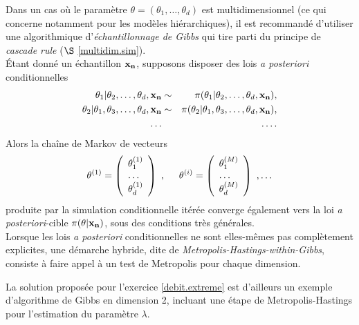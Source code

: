 Dans un cas où  le param\`etre $\theta=(\theta_1,\ldots,\theta_d)$ est multidimensionnel (ce qui concerne notamment pour les mod\`eles hi\'erarchiques), il est recommand\'e d'utiliser une algorithmique d'{\it \'echantillonnage de Gibbs} \cite{Robert2004} qui tire parti du principe de \emph{cascade rule} ($\S$ \ref{multidim.sim}). \\

\'Etant donné un échantillon ${\bf x_n}$,  supposons disposer des lois {\it a posteriori} conditionnelles   
\begin{eqnarray*}
\theta_1|\theta_2,\ldots,\theta_d,{\bf x_n} & \sim & \pi(\theta_1|\theta_2,\ldots,\theta_d,{\bf x_n}), \\
\theta_2|\theta_1,\theta_3,\ldots,\theta_d,{\bf x_n} & \sim & \pi(\theta_2|\theta_1,\theta_3,\ldots,\theta_d,{\bf x_n}), \\
\ldots & & \ldots.
\end{eqnarray*} 
Alors la cha\^ine de Markov de vecteurs 
\begin{eqnarray*}
\theta^{(1)}=\left(\begin{array}{l} \theta^{(1)}_1 \\ \ldots \\ \theta^{(1)}_d\end{array}\right) \ , \hspace{0.5cm} \theta^{(i)}=\left(\begin{array}{l} \theta^{(M)}_1 \\ \ldots \\ \theta^{(M)}_d\end{array}\right) \ , \ldots
\end{eqnarray*}
produite par la simulation conditionnelle it\'er\'ee converge \'egalement vers la loi {\it a posteriori}-cible $\pi(\theta|{\bf x_n})$, sous des conditions tr\`es g\'en\'erales. \\

Lorsque les lois {\it a posteriori} conditionnelles ne sont elles-m\^emes pas compl\`etement explicites, une d\'emarche hybride, dite de {\it Metropolis-Hastings-within-Gibbs}, consiste \`a faire appel \`a un test de Metropolis pour chaque dimension.

\begin{remark} 
La solution proposée pour l'exercice \ref{debit.extreme} est d'ailleurs un exemple d'algorithme de Gibbs en dimension 2, incluant une étape de Metropolis-Hastings pour l'estimation du paramètre $\lambda$. 
\end{remark}

